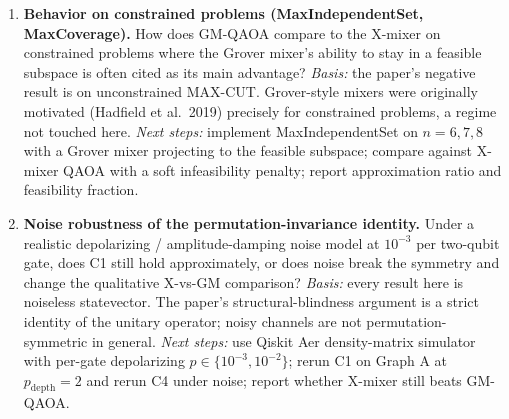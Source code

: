\begin{enumerate}
  \item \textbf{Behavior on constrained problems (MaxIndependentSet, MaxCoverage).} How does GM-QAOA compare to the X-mixer on constrained problems where the Grover mixer's ability to stay in a feasible subspace is often cited as its main advantage?
  \emph{Basis:} the paper's negative result is on unconstrained MAX-CUT. Grover-style mixers were originally motivated (Hadfield et al.~2019) precisely for constrained problems, a regime not touched here.
  \emph{Next steps:} implement MaxIndependentSet on $n=6,7,8$ with a Grover mixer projecting to the feasible subspace; compare against X-mixer QAOA with a soft infeasibility penalty; report approximation ratio and feasibility fraction.

  \item \textbf{Noise robustness of the permutation-invariance identity.} Under a realistic depolarizing / amplitude-damping noise model at $10^{-3}$ per two-qubit gate, does C1 still hold approximately, or does noise break the symmetry and change the qualitative X-vs-GM comparison?
  \emph{Basis:} every result here is noiseless statevector. The paper's structural-blindness argument is a strict identity of the unitary operator; noisy channels are not permutation-symmetric in general.
  \emph{Next steps:} use Qiskit Aer density-matrix simulator with per-gate depolarizing $p \in \{10^{-3},10^{-2}\}$; rerun C1 on Graph A at $p_{\mathrm{depth}}=2$ and rerun C4 under noise; report whether X-mixer still beats GM-QAOA.
\end{enumerate}
